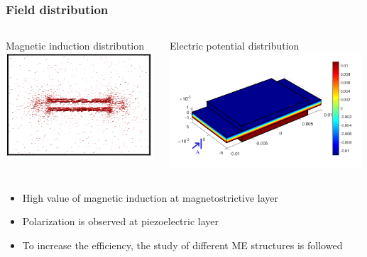 \documentclass[compress]{beamer}
\begin{document}
\begin{frame}\frametitle{Field distribution}
\begin{columns}[totalwidth=\textwidth]
 \begin{column}{.5\textwidth}
 \centering
 Magnetic induction distribution
 \includegraphics[height=0.8\textwidth, width=0.99\textwidth]{Graphic/03_MErectamagnefluxXZview}
 \end{column}
 \begin{column}{.5\textwidth}
 \centering
 Electric potential distribution
 \includegraphics[height=0.8\textwidth, width=0.99\textwidth]{Graphic/03_MErectaelecpoten3d}
  \end{column}
\end{columns}
\begin{itemize}[label=$\bullet$, font=\small, leftmargin=*]
 \item High value of magnetic induction at magnetostrictive layer
 \item Polarization is observed at piezoelectric layer
 \item To increase the efficiency, the study of different ME structures is followed
 \end{itemize}
\end{frame}
\end{document}
